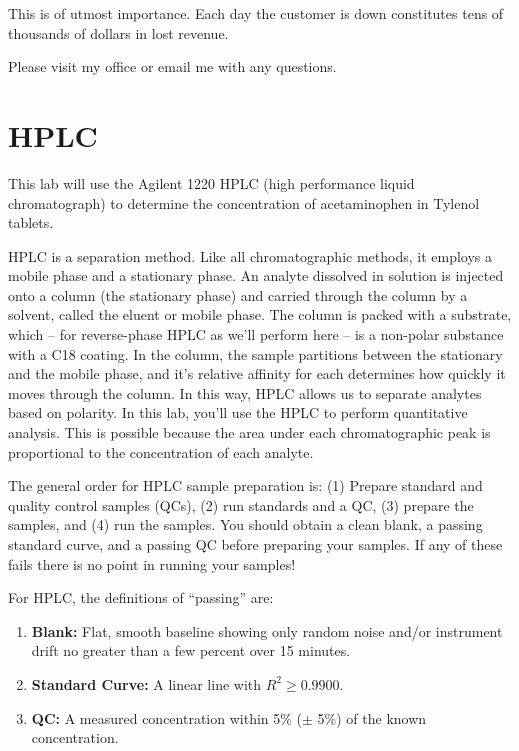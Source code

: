 \documentclass[]{tufte-book}
\providecommand{\tightlist}{%
  \setlength{\itemsep}{0pt}\setlength{\parskip}{0pt}}
\begin{document}
This is of utmost importance. Each day the customer is down constitutes tens of thousands of dollars in lost revenue.

Please visit my office or email me with any questions.

\newpage

\hypertarget{hplc-1}{%
\section{HPLC}\label{hplc-1}}

This lab will use the Agilent 1220 HPLC (high performance liquid chromatograph) to determine the concentration of acetaminophen in Tylenol tablets.

HPLC is a separation method. Like all chromatographic methods, it employs a mobile phase and a stationary phase. An analyte dissolved in solution is injected onto a column (the stationary phase) and carried through the column by a solvent, called the eluent or mobile phase. The column is packed with a substrate, which -- for reverse-phase HPLC as we'll perform here -- is a non-polar substance with a C18 coating. In the column, the sample partitions between the stationary and the mobile phase, and it's relative affinity for each determines how quickly it moves through the column. In this way, HPLC allows us to separate analytes based on polarity. In this lab, you'll use the HPLC to perform quantitative analysis. This is possible because the area under each chromatographic peak is proportional to the concentration of each analyte.

The general order for HPLC sample preparation is: (1) Prepare standard and quality control samples (QCs), (2) run standards and a QC, (3) prepare the samples, and (4) run the samples. You should obtain a clean blank, a passing standard curve, and a passing QC before preparing your samples. If any of these fails there is no point in running your samples!

For HPLC, the definitions of ``passing'' are:

\begin{enumerate}
\def\labelenumi{\arabic{enumi}.}
\tightlist
\item
  \textbf{Blank:} Flat, smooth baseline showing only random noise and/or instrument drift no greater than a few percent over 15 minutes.\\
\item
  \textbf{Standard Curve:} A linear line with \(R^2 \ge 0.9900\).\\
\item
  \textbf{QC:} A measured concentration within 5\% (\(\pm\) 5\%) of the known concentration.
\end{enumerate}
\end{document}
